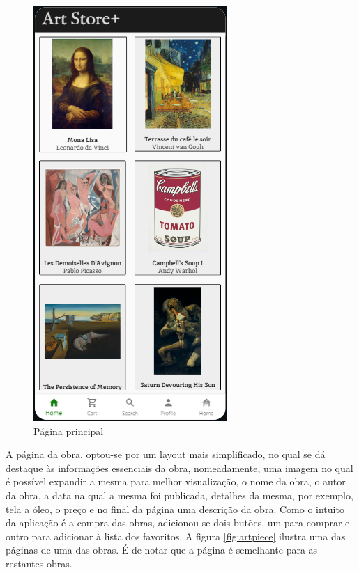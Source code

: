 \documentclass[conference]{IEEEtran}
\begin{document}
\begin{figure}[h]
    \centering
    \includegraphics[scale=0.4]{mainpage.png}
    \caption{Página principal}
    \label{fig:mainpage}
\end{figure}

A página da obra, optou-se por um layout mais simplificado, no qual se dá destaque às informações 
essenciais da obra, nomeadamente, uma imagem no qual é possível expandir a mesma para melhor visualização, 
o nome da obra, o autor da obra, a data na qual a mesma foi publicada, detalhes da mesma, por exemplo, 
tela a óleo, o preço e no final da página uma descrição da obra. Como o intuito da aplicação é 
a compra das obras, adicionou-se dois butões, um para comprar e outro para adicionar à lista dos favoritos.
A figura \ref{fig:artpiece} ilustra uma das páginas de uma das obras. É de notar que a página 
é semelhante para as restantes obras.
\end{document}
